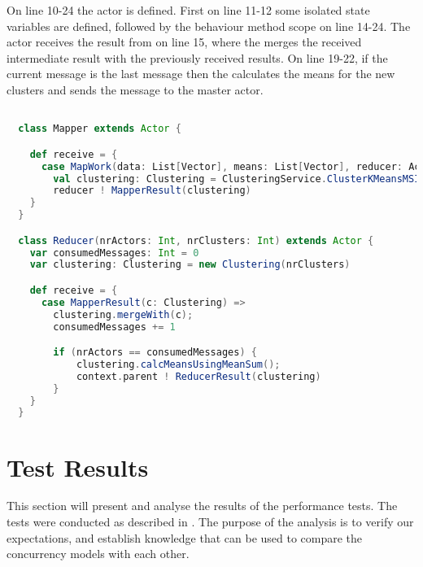 On line 10-24 the  actor is defined. First on line 11-12 some isolated state variables are defined, followed by the behaviour method scope on line 14-24.
The  actor receives the result from  on line 15, where the  merges the received intermediate result with the previously received results. On line 19-22, if the current message is the last message then the  calculates the means for the new clusters and sends the  message to the master actor.

\begin{lstlisting}[float,label=lst:actor_implementation,
  caption={Actor Implementation},
  language=Scala,  
  showspaces=false,
  showtabs=false,
  breaklines=true,
  showstringspaces=false,
  breakatwhitespace=true,
  commentstyle=\color{greencomments},
  keywordstyle=\color{bluekeywords},
  stringstyle=\color{redstrings}]  % Start your code-block

  class Mapper extends Actor {

    def receive = {
      case MapWork(data: List[Vector], means: List[Vector], reducer: ActorRef) =>
        val clustering: Clustering = ClusteringService.ClusterKMeansMSIncremental(data, means)
        reducer ! MapperResult(clustering)
    }
  }

  class Reducer(nrActors: Int, nrClusters: Int) extends Actor {
    var consumedMessages: Int = 0
    var clustering: Clustering = new Clustering(nrClusters)

    def receive = {
      case MapperResult(c: Clustering) =>
        clustering.mergeWith(c);
        consumedMessages += 1

        if (nrActors == consumedMessages) {
            clustering.calcMeansUsingMeanSum();
            context.parent ! ReducerResult(clustering)
        }
    }
  }  
\end{lstlisting}

\section{Test Results}
This section will present and analyse the results of the performance tests. The tests were conducted as described in . The purpose of the analysis is to verify our expectations, and establish knowledge that can be used to compare the concurrency models with each other.

